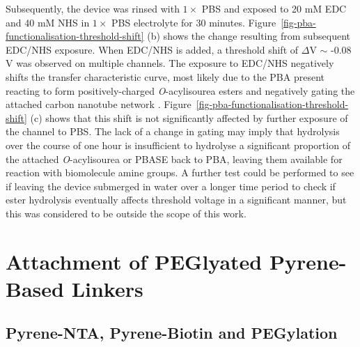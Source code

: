 \documentclass[
  a4paper,
]{scrbook}
\begin{document}
Subsequently, the device was rinsed with \(1 \times\) PBS and exposed to
20 mM EDC and 40 mM NHS in \(1 \times\) PBS electrolyte for 30 minutes.
Figure~\ref{fig-pba-functionalisation-threshold-shift} (b) shows the
change resulting from subsequent EDC/NHS exposure. When EDC/NHS is
added, a threshold shift of \(\Delta\)V \(\sim\) -0.08 V was observed on
multiple channels. The exposure to EDC/NHS negatively shifts the
transfer characteristic curve, most likely due to the PBA present
reacting to form positively-charged \emph{O}-acylisourea esters and
negatively gating the attached carbon nanotube network
\autocite{Heller2008,Hermanson2013-4}.
Figure~\ref{fig-pba-functionalisation-threshold-shift} (c) shows that
this shift is not significantly affected by further exposure of the
channel to PBS. The lack of a change in gating may imply that hydrolysis
over the course of one hour is insufficient to hydrolyse a significant
proportion of the attached \emph{O}-acylisourea or PBASE back to PBA,
leaving them available for reaction with biomolecule amine groups. A
further test could be performed to see if leaving the device submerged
in water over a longer time period to check if ester hydrolysis
eventually affects threshold voltage in a significant manner, but this
was considered to be outside the scope of this work.

\hypertarget{attachment-of-peglyated-pyrene-based-linkers}{%
\section{Attachment of PEGlyated Pyrene-Based
Linkers}\label{attachment-of-peglyated-pyrene-based-linkers}}

\hypertarget{sec-NTA-biotin-PEG}{%
\subsection{Pyrene-NTA, Pyrene-Biotin and
PEGylation}\label{sec-NTA-biotin-PEG}}
\end{document}
